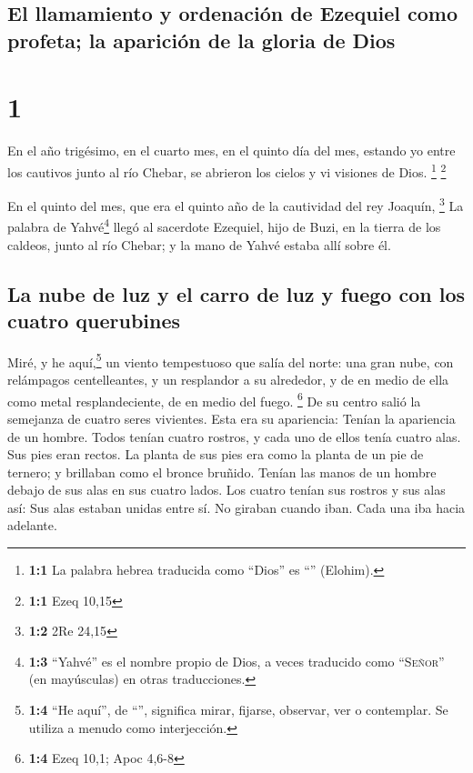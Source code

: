 \hypertarget{el-llamamiento-y-ordenaciuxf3n-de-ezequiel-como-profeta-la-apariciuxf3n-de-la-gloria-de-dios}{%
\subsection{El llamamiento y ordenación de Ezequiel como profeta; la
aparición de la gloria de
Dios}\label{el-llamamiento-y-ordenaciuxf3n-de-ezequiel-como-profeta-la-apariciuxf3n-de-la-gloria-de-dios}}

\hypertarget{section}{%
\section{1}\label{section}}

 En el año trigésimo, en el cuarto mes, en el quinto día
del mes, estando yo entre los cautivos junto al río Chebar, se abrieron
los cielos y vi visiones de Dios. \footnote{\textbf{1:1} La palabra
  hebrea traducida como ``Dios'' es ``'' (Elohim).}
\footnote{\textbf{1:1} Ezeq 10,15}

 En el quinto del mes, que era el quinto año de la
cautividad del rey Joaquín, \footnote{\textbf{1:2} 2Re 24,15}
 La palabra de Yahvé\footnote{\textbf{1:3} ``Yahvé'' es el
  nombre propio de Dios, a veces traducido como ``\textsc{Señor}'' (en
  mayúsculas) en otras traducciones.} llegó al sacerdote Ezequiel, hijo
de Buzi, en la tierra de los caldeos, junto al río Chebar; y la mano de
Yahvé estaba allí sobre él.

\hypertarget{la-nube-de-luz-y-el-carro-de-luz-y-fuego-con-los-cuatro-querubines}{%
\subsection{La nube de luz y el carro de luz y fuego con los cuatro
querubines}\label{la-nube-de-luz-y-el-carro-de-luz-y-fuego-con-los-cuatro-querubines}}

 Miré, y he aquí,\footnote{\textbf{1:4} ``He aquí'', de
  ``'', significa mirar, fijarse, observar, ver o
  contemplar. Se utiliza a menudo como interjección.} un viento
tempestuoso que salía del norte: una gran nube, con relámpagos
centelleantes, y un resplandor a su alrededor, y de en medio de ella
como metal resplandeciente, de en medio del fuego. \footnote{\textbf{1:4}
  Ezeq 10,1; Apoc 4,6-8}  De su centro salió la semejanza
de cuatro seres vivientes. Esta era su apariencia: Tenían la apariencia
de un hombre.  Todos tenían cuatro rostros, y cada uno de
ellos tenía cuatro alas.  Sus pies eran rectos. La planta
de sus pies era como la planta de un pie de ternero; y brillaban como el
bronce bruñido.  Tenían las manos de un hombre debajo de
sus alas en sus cuatro lados. Los cuatro tenían sus rostros y sus alas
así:  Sus alas estaban unidas entre sí. No giraban cuando
iban. Cada una iba hacia adelante.

